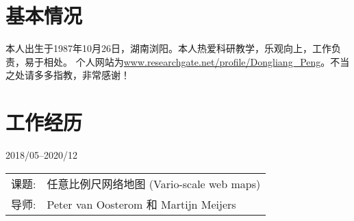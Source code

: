 \documentclass{resume}
\begin{document}


 
\section{基本情况}
本人出生于1987年10月26日，湖南浏阳。本人热爱科研教学，乐观向上，工作负责，易于相处。
个人网站为\url{www.researchgate.net/profile/Dongliang_Peng}。不当之处请多多指教，非常感谢！\footnotemark
{}

\section{工作经历}
{2018/05--2020/12}
\begin{tabular}{ll}	
	课题:  &  任意比例尺网络地图 (Vario-scale web maps) \\
	导师:      & Peter van Oosterom 和 Martijn Meijers
\end{tabular}%


\end{document}
